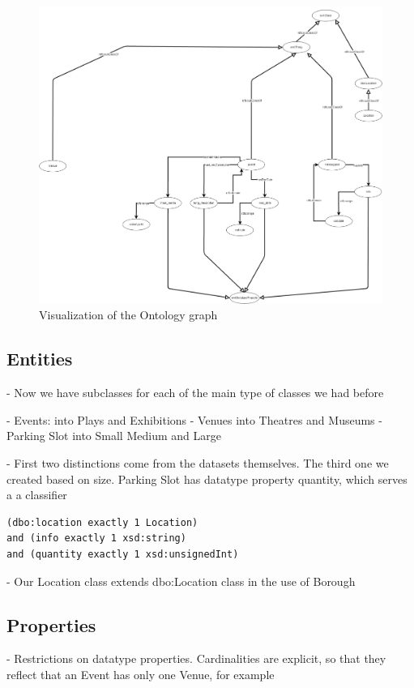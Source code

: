 \documentclass[runningheads,a4paper]{../../StyleFiles/llncs}
\begin{document}
\begin{figure}[h]
	\centering
	\includegraphics[width=.7\textwidth]{img/ontology.png}
	\caption{Visualization of the Ontology graph}
	\label{fig:ontology}
\end{figure}

\subsection{Entities}
- Now we have subclasses for each of the main type of classes we had before

- Events: into Plays and Exhibitions
- Venues into Theatres and Museums
- Parking Slot into Small Medium and Large

- First two distinctions come from the datasets themselves. The third one we created based on size. Parking Slot has datatype property quantity, which serves a a classifier

\begin{lstlisting}[captionpos=b, caption=Definition of Large Slot a subclass of Parking Slot, label=lst:owl, basicstyle=\ttfamily\small,frame=bt]
(dbo:location exactly 1 Location)
and (info exactly 1 xsd:string)
and (quantity exactly 1 xsd:unsignedInt)
\end{lstlisting}

- Our Location class extends dbo:Location class in the use of Borough

\subsection{Properties}

- Restrictions on datatype properties. Cardinalities are explicit, so that they reflect that an Event has only one Venue, for example
\end{document}
